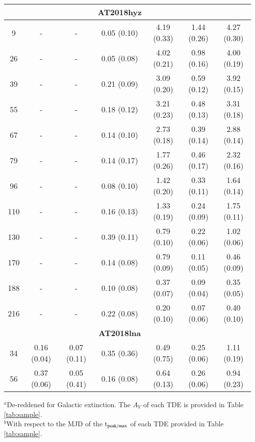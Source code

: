 \documentclass[structabstract]{aa}
\begin{document}
\begin{small}
\begin{longtable}{c c c c c c c}
	&		&		&	\textbf{AT2018hyz}	&		&		&	\\ \hline
9	&	-	&	-	&	0.05 (0.10)	&	4.19 (0.33)	&	1.44 (0.26)	&	4.27 (0.30)  \\
26	&	-	&	-	&	0.05 (0.08)	&	4.02 (0.21)	&	0.98 (0.16)	&	4.00 (0.19)  \\
39	&	-	&	-	&	0.21 (0.09)	&	3.09 (0.20)	&	0.59 (0.12)	&	3.92 (0.15)  \\
55	&	-	&	-	&	0.18 (0.12)	&	3.21 (0.23)	&	0.48 (0.13)	&	3.31 (0.18)  \\
67	&	-	&	-	&	0.14 (0.10)	&	2.73 (0.18)	&	0.39 (0.14)	&	2.88 (0.14)  \\
79	&	-	&	-	&	0.14 (0.17)	&	1.77 (0.26)	&	0.46 (0.17)	&	2.32 (0.16)  \\
96	&	-	&	-	&	0.08 (0.10)	&	1.42 (0.20)	&	0.33 (0.11)	&	1.64 (0.14)  \\
110	&	-	&	-	&	0.16 (0.13)	&	1.33 (0.19)	&	0.24 (0.09)	&	1.75 (0.11)  \\
130	&	-	&	-	&	0.39 (0.11)	&	0.79 (0.10)	&	0.22 (0.06)	&	1.02 (0.06)  \\
170	&	-	&	-	&	0.14 (0.08)	&	0.79 (0.09)	&	0.11 (0.05)	&	0.46 (0.09)  \\
188	&	-	&	-	&	0.10 (0.08)	&	0.37 (0.07)	&	0.09 (0.04)	&	0.35 (0.05)  \\
216	&	-	&	-	&	0.22 (0.08)	&	0.20 (0.10)	&	0.07 (0.06)	&	0.40 (0.10)  \\ \hline
	&		&		&	\textbf{AT2018lna}	&		&		&	\\ \hline
34	&	0.16 (0.04)	&	0.07 (0.11)	&	0.35 (0.36)	&	0.49 (0.75)	&	0.25 (0.06)	&	1.11 (0.19)  \\
56	&	0.37 (0.06)	&	0.05 (0.41)	&	0.16 (0.08)	&	0.64 (0.13)	&	0.26 (0.06)	&	0.94 (0.23)  \\  \hline

\end{longtable}
$^{a}$De-reddened for Galactic extinction. The $A_{V}$ of each TDE is provided in Table  \ref{tab:sample}. \\
$^{b}$With respect to the MJD of the t$_{\rm peak/max}$ of each TDE provided in Table \ref{tab:sample}. %
\end{small}
\end{document}
